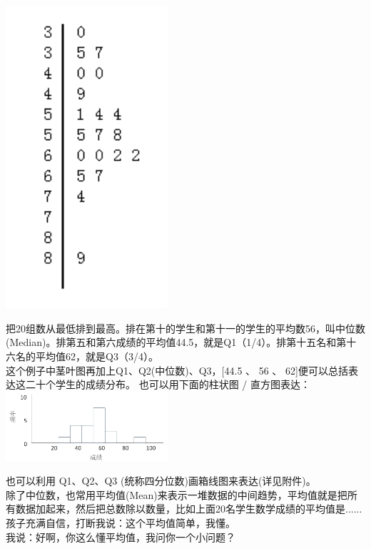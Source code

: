 \includegraphics[width=6cm]{MA_FA2_101.jpg}

把20组数从最低排到最高。排在第十的学生和第十一的学生的平均数56，叫中位数(Median)。排第五和第六成绩的平均值44.5，就是Q1（1/4）。排第十五名和第十六名的平均值62，就是Q3（3/4）。\\
这个例子中茎叶图再加上Q1、Q2(中位数)、Q3，{[}44.5 、 56 、
62{]}便可以总括表达这二十个学生的成绩分布。 也可以用下面的柱状图 /
直方图表达：\\

\includegraphics[width=6cm]{MA_FA1_1-1.jpg}

也可以利用 Q1、Q2、Q3 (统称四分位数)画箱线图来表达(详见附件)。\\
除了中位数，也常用平均值(Mean)来表示一堆数据的中间趋势，平均值就是把所有数据加起来，然后把总数除以数量，比如上面20名学生数学成绩的平均值是......\\
孩子充满自信，打断我说：这个平均值简单，我懂。\\
我说：好啊，你这么懂平均值，我问你一个小问题？\\



